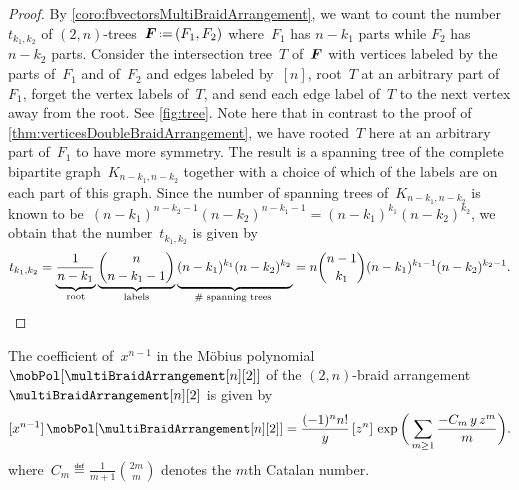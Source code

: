 \begin{proof}
By \cref{coro:fbvectorsMultiBraidArrangement}, we want to count the number~$t_{k_1,k_2}$ of $(2,n)$-trees~$\b{F} \eqdef (F_1,F_2)$ where~$F_1$ has $n-k_1$ parts while $F_2$ has $n-k_2$ parts.
Consider the intersection tree~$T$ of~$\boldsymbol{F}$ with vertices labeled by the parts of~$F_1$ and of~$F_2$ and edges labeled by~$[n]$, root~$T$ at an arbitrary part of~$F_1$, forget the vertex labels of~$T$, and send each edge label of~$T$ to the next vertex away from the root.
See \cref{fig:tree}.
Note here that in contrast to the proof of \cref{thm:verticesDoubleBraidArrangement}, we have rooted~$T$ here at an arbitrary part of~$F_1$ to have more symmetry.
The result is a spanning tree of the complete bipartite graph~$K_{n-k_1, n-k_2}$ together with a choice of which of the labels are on each part of this graph.
Since the number of spanning trees of~$K_{n-k_1, n-k_2}$ is known to be~$(n-k_1)^{n-k_2-1} (n-k_2)^{n-k_1-1} = (n-k_1)^{k_1} (n-k_2)^{k_2}$, we obtain that the number~$t_{k_1,k_2}$ is given by
\[
t_{k_1,k_2} = \underbrace{\frac{1}{n-k_1}  \phantom{\!\!\!\!\bigg)}}_{\text{root}} \underbrace{\binom{n}{n-k_1-1}}_{\text{labels}} \underbrace{(n-k_1)^{k_1} (n-k_2)^{k_2} \phantom{\!\!\!\!\bigg)}}_{\# \text{ spanning trees }} = n \binom{n-1}{k_1} (n-k_1)^{k_1-1} (n-k_2)^{k_2-1}.
\qedhere
\]
\end{proof}


\begin{theorem}
\label{thm:regionsDoubleBraidArrangement}
The coefficient of~$x^{n-1}$ in the M\"obius polynomial~$\mobPol[{\multiBraidArrangement[n][2]}]$ of the $(2,n)$-braid arrangement~$\multiBraidArrangement[n][2]$ is given by
\[
[x^{n-1}] \, \mobPol[{\multiBraidArrangement[n][2]}] = \frac{(-1)^n n!}{y} \, [z^n] \, \exp \bigg( \sum_{m \ge 1} \frac{- C_m \, y \, z^m}{m} \bigg).
\]
where~$\displaystyle C_m \eqdef \frac{1}{m+1} \binom{2m}{m}$ denotes the $m$th Catalan number.
\end{theorem}

